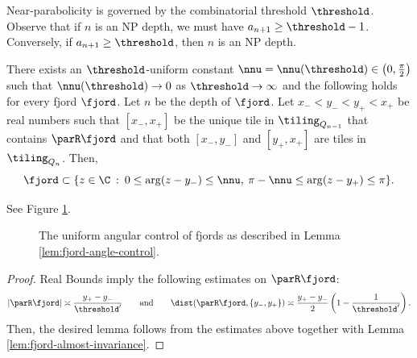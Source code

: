 \documentclass{amsart}
\begin{document}
Near-parabolicity is governed by the combinatorial threshold $\threshold$. 
Observe that if $n$ is an NP depth, we must have $a_{n+1} \geq \threshold -1$. 
Conversely, if $a_{n+1} \geq \threshold$, then $n$ is an NP depth.

\begin{lemma}
\label{lem:fjord-angle-control}
    There exists an $\threshold$-uniform constant $\nnu = \nnu(\threshold) \in \left( 0,\frac{\pi}{2} \right)$ such that $\nnu(\threshold) \to 0$ as $\threshold \to \infty$ and the following holds for every fjord $\fjord$.
    Let $n$ be the depth of $\fjord$.
    Let $x_- < y_- < y_+ < x_+$ be real numbers such that $[x_-,x_+]$ be the unique tile in $\tiling_{Q_{n-1}}$ that contains $\parR \fjord$ and that both $[x_-,y_-]$ and $[y_+,x_+]$ are tiles in $\tiling_{Q_n}$. 
    Then,
    \[
        \fjord \subset \{z \in \C \: : \: 0 \leq \arg(z-y_-) \leq \nnu, \: \pi-\nnu \leq \arg(z-y_+) \leq \pi \}. 
    \]
\end{lemma}

See Figure \ref{fig:angular-control-fjords}.
\begin{figure}
    \centering
    \caption{The uniform angular control of fjords as described in Lemma \ref{lem:fjord-angle-control}.}
    \label{fig:angular-control-fjords}
\end{figure}




\begin{proof}
    Real Bounds imply the following estimates on $\parR \fjord$:
    \[
        |\parR \fjord| \asymp \frac{y_+-y_-}{\threshold'} \qquad \text{and} \qquad
        \dist(\parR \fjord, \{y_-,y_+\}) \asymp \frac{y_+-y_-}{2}\left( 1-\frac{1}{\threshold'}\right).
    \]
    Then, the desired lemma follows from the estimates above together with Lemma \ref{lem:fjord-almost-invariance}.
\end{proof}
\end{document}
